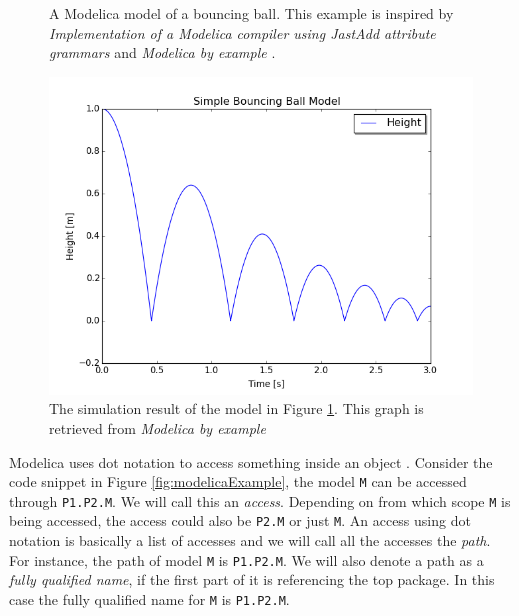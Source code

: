 \documentclass{cslthse-msc}
\begin{document}
\begin{figure}[!htbp]
    \centering
    
    \caption{A Modelica model of a bouncing ball. This example is inspired by \textit{Implementation of a Modelica compiler using JastAdd attribute grammars} \cite{aakesson2010implementation} and \textit{Modelica by example} \cite{tillermodelica}.}
    \label{fig:bouncingBallCode}
\end{figure}

\begin{figure}[!htbp]
    \centering
    \includegraphics[width=1.0\textwidth]{Pictures/BB1.png}
    \caption{The simulation result of the model in Figure \ref{fig:bouncingBallCode}. This graph is retrieved from \textit{Modelica by example} \cite{tillermodelica}}
    \label{fig:bouncingBallSimulation}
\end{figure}

Modelica uses dot notation to access something inside an object \cite{modelicamodelica}. Consider the code snippet in Figure \ref{fig:modelicaExample}, the model \texttt{M} can be accessed through \texttt{P1.P2.M}. We will call this an \emph{access}. Depending on from which scope \texttt{M} is being accessed, the access could also be \texttt{P2.M} or just \texttt{M}. An access using dot notation is basically a list of accesses and we will call all the accesses the \emph{path}. For instance, the path of model \texttt{M} is \texttt{P1.P2.M}. We will also denote a path as a \emph{fully qualified name}, if the first part of it is referencing the top package. In this case the fully qualified name for \texttt{M} is \texttt{P1.P2.M}.
\end{document}
